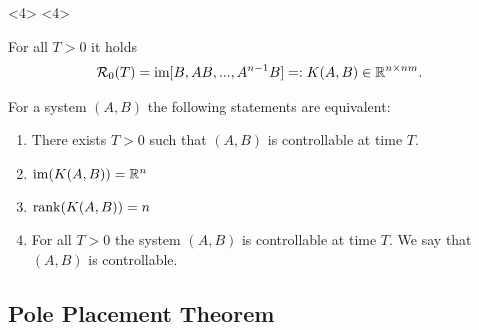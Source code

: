 \begin{frame}
\begin{onlyenv}<4>
<4>
	\begin{mythm}
		For all $T>0$ it holds
		\begin{align*}
		\mathcal{R}_0(T) = \operatorname{im}[B,AB,...,A^{n-1}B]   =: K(A,B) \in \mathbb{R}^{n \times nm}.
		\end{align*}
	\end{mythm}
	\begin{mycor}\label{cor:ctrb}
		For a system $(A,B)$ the following statements are equivalent:
		\begin{enumerate}
			\item There exists $T>0$ such that $(A,B)$ is controllable at time $T$.
			\item $\operatorname{im}(K(A,B)) = \mathbb{R}^n$
			\item $\operatorname{rank}(K(A,B)) = n$
			\item For all $T>0$ the system $(A,B)$ is controllable at time $T$. We say that $(A,B)$ is controllable.
		\end{enumerate}
	\end{mycor}
\end{onlyenv}

\end{frame}

\subsection{Pole Placement Theorem}

